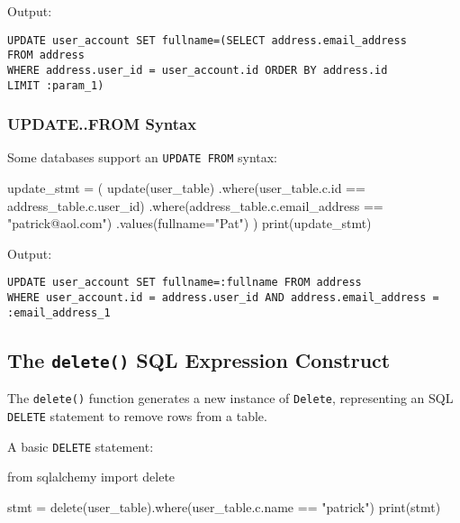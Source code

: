 \documentclass[
  letterpaper,
  DIV=11,
  numbers=noendperiod]{scrreprt}
\newenvironment{Shaded}{\begin{snugshade}}{\end{snugshade}}
\newcommand{\BuiltInTok}[1]{\textcolor[rgb]{0.00,0.23,0.31}{#1}}
\newcommand{\ImportTok}[1]{\textcolor[rgb]{0.00,0.46,0.62}{#1}}
\newcommand{\NormalTok}[1]{\textcolor[rgb]{0.00,0.23,0.31}{#1}}
\newcommand{\OperatorTok}[1]{\textcolor[rgb]{0.37,0.37,0.37}{#1}}
\newcommand{\StringTok}[1]{\textcolor[rgb]{0.13,0.47,0.30}{#1}}
\begin{document}
Output:

\begin{verbatim}
UPDATE user_account SET fullname=(SELECT address.email_address
FROM address
WHERE address.user_id = user_account.id ORDER BY address.id
LIMIT :param_1)
\end{verbatim}

\subsubsection{UPDATE..FROM Syntax}\label{update..from-syntax}

Some databases support an \texttt{UPDATE\ FROM} syntax:

\begin{Shaded}
\begin{Highlighting}[]
\NormalTok{update\_stmt }\OperatorTok{=}\NormalTok{ (}
\NormalTok{    update(user\_table)}
\NormalTok{    .where(user\_table.c.}\BuiltInTok{id} \OperatorTok{==}\NormalTok{ address\_table.c.user\_id)}
\NormalTok{    .where(address\_table.c.email\_address }\OperatorTok{==} \StringTok{"patrick@aol.com"}\NormalTok{)}
\NormalTok{    .values(fullname}\OperatorTok{=}\StringTok{"Pat"}\NormalTok{)}
\NormalTok{)}
\BuiltInTok{print}\NormalTok{(update\_stmt)}
\end{Highlighting}
\end{Shaded}

Output:

\begin{verbatim}
UPDATE user_account SET fullname=:fullname FROM address
WHERE user_account.id = address.user_id AND address.email_address = :email_address_1
\end{verbatim}

\subsection{\texorpdfstring{The \texttt{delete()} SQL Expression
Construct}{The delete() SQL Expression Construct}}\label{the-delete-sql-expression-construct}

The \texttt{delete()} function generates a new instance of
\texttt{Delete}, representing an SQL \texttt{DELETE} statement to remove
rows from a table.

A basic \texttt{DELETE} statement:

\begin{Shaded}
\begin{Highlighting}[]
\ImportTok{from}\NormalTok{ sqlalchemy }\ImportTok{import}\NormalTok{ delete}

\NormalTok{stmt }\OperatorTok{=}\NormalTok{ delete(user\_table).where(user\_table.c.name }\OperatorTok{==} \StringTok{"patrick"}\NormalTok{)}
\BuiltInTok{print}\NormalTok{(stmt)}
\end{Highlighting}
\end{Shaded}
\end{document}
